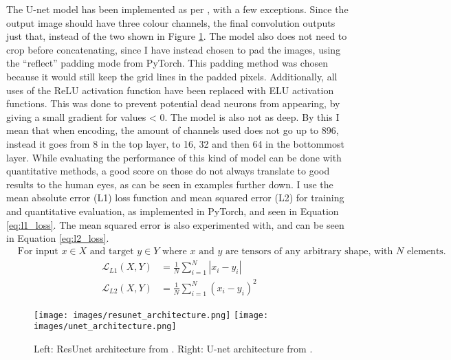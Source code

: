 The U-net model has been implemented as per \cite{unet}, with a few exceptions. Since the output image should have three colour channels, the final convolution outputs just that, instead of the two shown in Figure \ref{img:architectures}. The model also does not need to crop before concatenating, since I have instead chosen to pad the images, using the ``reflect'' padding mode from PyTorch. This padding method was chosen because it would still keep the grid lines in the padded pixels. Additionally, all uses of the ReLU activation function have been replaced with ELU activation functions. This was done to prevent potential dead neurons from appearing, by giving a small gradient for values < 0. The model is also not as deep. By this I mean that when encoding, the amount of channels used does not go up to 896, instead it goes from 8 in the top layer, to 16, 32 and then 64 in the bottommost layer. While evaluating the performance of this kind of model can be done with quantitative methods, a good score on those do not always translate to good results to the human eyes, as can be seen in examples further down. I use the mean absolute error (L1) loss function and mean squared error (L2) for training and quantitative evaluation, as implemented in PyTorch, and seen in Equation \ref{eq:l1_loss}. The mean squared error is also experimented with, and can be seen in Equation \ref{eq:l2_loss}.
\begin{align*}
  &\text{For input $x\in X$ and target $y\in Y$ where $x$ and $y$ are tensors of any arbitrary shape, with $N$ elements.}
\end{align*}
\begin{align}
  \mathcal{L}_{L1}(X,Y) &= \frac{1}{N} \sum^N_{i=1} |x_i - y_i| \label{eq:l1_loss}\\
  \mathcal{L}_{L2}(X,Y) &= \frac{1}{N} \sum^N_{i=1} (x_i - y_i)^2 \label{eq:l2_loss}
\end{align}

\begin{figure}[H]
  \centering
  \captionsetup{justification=centering}
  \texttt{[image: images/resunet\_architecture.png]}
  \texttt{[image: images/unet\_architecture.png]}
  \caption[center]{Left: ResUnet architecture from \cite{resunet}. Right: U-net architecture from \cite{unet}.}\label{img:architectures}
\end{figure}

